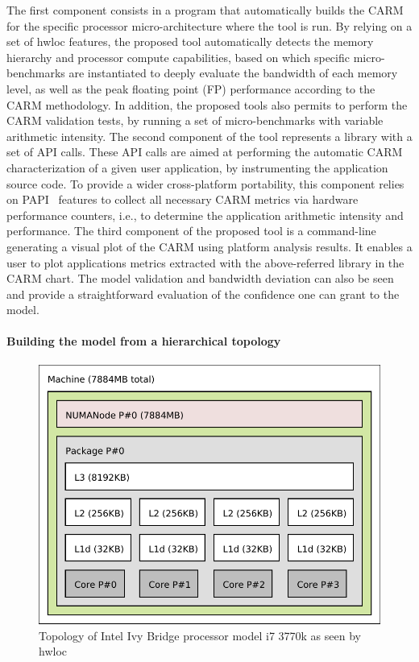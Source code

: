 \documentclass[twoside,twocolumn,8pt]{extarticle}
\begin{document}
The first component consists in a program that automatically  builds the CARM for the specific processor micro-architecture where
the tool is run. By relying on a set of hwloc features, the proposed tool automatically detects the memory hierarchy and processor
compute capabilities, based on which specific micro-benchmarks are instantiated to deeply evaluate the bandwidth of each memory
level,  as well as the peak floating point (FP) performance according to the CARM methodology.
In addition, the proposed tools also permits to perform the CARM validation tests, by running a set of micro-benchmarks with
variable arithmetic intensity. 
The second component of the tool represents  a library with a set of API calls. These API calls are aimed at performing the
automatic CARM characterization of a given user application, by instrumenting the application source code.
To provide a wider cross-platform portability, this component relies on PAPI~\cite{mucci1999papi} features to collect all
necessary CARM metrics via hardware performance counters, i.e., to determine the application arithmetic intensity and performance.
The third component of the proposed tool is a command-line generating a visual plot of the CARM using platform analysis results. It
enables a user to plot applications metrics extracted with the above-referred library in the CARM chart.
The model validation and bandwidth deviation can also be seen and provide a straightforward evaluation of the confidence one can
grant to the model.

\paragraph*{Building the model from a hierarchical topology}

\begin{figure}
  \includegraphics[width=.5\textwidth]{pictures/i7_3770k.pdf}
  \caption{Topology of Intel Ivy Bridge processor model i7 3770k as seen by hwloc}
  \label{fig:topology_adriana}
\end{figure}
\end{document}
